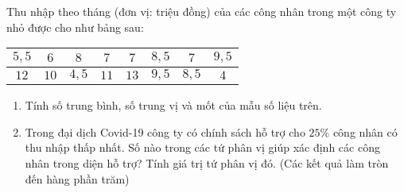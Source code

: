 \begin{bt}%
	Thu nhập theo tháng (đơn vị: triệu đồng) của các công nhân trong một công ty nhỏ được cho như bảng sau:
	\begin{center}
		\begin{tabular}{|c|c|c|c|c|c|c|c|}
		\hline $5{,}5$ & $6$ & $8$ & $7$ & $7$ & $8{,}5$ & $7$ & $9{,}5$ \\
		\hline $12$ & $10$ & $4{,}5$ & $11$ & $13$ & $9{,}5$ & $8{,}5$ & $4$ \\
		\hline
	\end{tabular}
	\end{center}
	\begin{enumerate}
		\item Tính số trung bình, số trung vị và mốt của mẫu số liệu trên.
		\item Trong đại dịch Covid-19 công ty có chính sách hỗ trợ cho $25\%$ công nhân có thu nhập thấp nhất. Số nào trong các tứ phân vị giúp xác định các công nhân trong diện hỗ trợ? Tính giá trị tứ phân vị đó. (Các kết quả làm tròn đến hàng phần trăm)
	\end{enumerate}
\end{bt}
